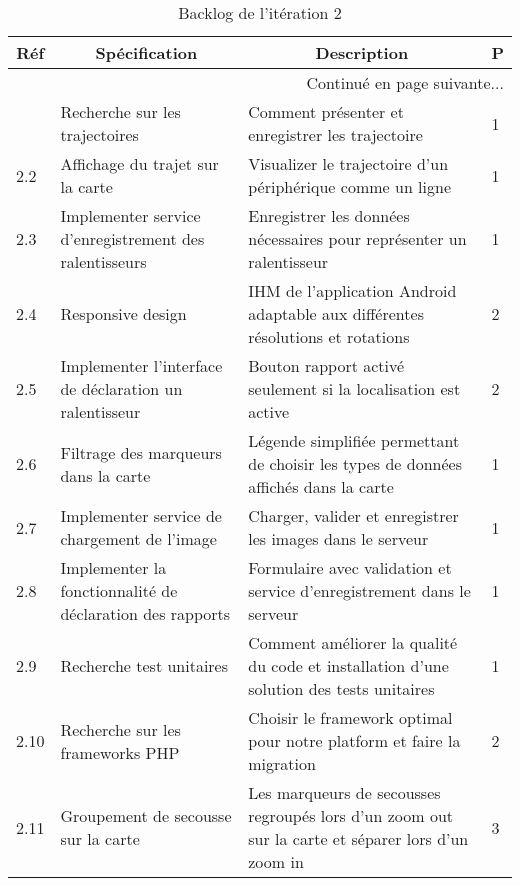 \begin{center}
    \footnotesize
    \begin{longtable}{| p{1cm} | p{5cm} | p{7cm} | l |}
        \caption{Backlog de l'itération 2}
\label{tab:sprint2-backlog} \\

        \hline
        \multicolumn{1}{|c}{\textbf{Réf}} &
        \multicolumn{1}{|c}{\textbf{Spécification}} &
        \multicolumn{1}{|c}{\textbf{Description}} &
        \multicolumn{1}{|c|}{\textbf{P}} \\ \hline
        \endhead

        \hline \multicolumn{4}{|r|}{{Continué en page suivante$\dotsc$}} \\ \hline
        \endfoot

        \hline \hline
        \endlastfoot

        \hline
2.1 & Recherche sur les trajectoires & Comment présenter et enregistrer les trajectoire & 1 \\ \hline
2.2 & Affichage du trajet sur la carte & Visualizer le trajectoire d'un périphérique comme un ligne & 1 \\ \hline
2.3 & Implementer service d'enregistrement des ralentisseurs & Enregistrer les données nécessaires pour représenter un ralentisseur & 1 \\ \hline
2.4 & Responsive design & IHM de l'application Android adaptable aux différentes résolutions et rotations & 2 \\ \hline
2.5 & Implementer l'interface de déclaration un ralentisseur & Bouton rapport activé seulement si la localisation est active & 2 \\ \hline
2.6 & Filtrage des marqueurs dans la carte & Légende simplifiée permettant de choisir les types de données affichés dans la carte & 1 \\ \hline
2.7 & Implementer service de chargement de l'image & Charger, valider et enregistrer les images dans le serveur & 1 \\ \hline
2.8 & Implementer la fonctionnalité de déclaration des rapports & Formulaire avec validation et service d'enregistrement dans le serveur & 1 \\ \hline
2.9 & Recherche test unitaires & Comment améliorer la qualité du code et installation d'une solution des tests unitaires & 1 \\ \hline
2.10 & Recherche sur les frameworks PHP & Choisir le framework optimal pour notre platform et faire la migration & 2 \\ \hline
2.11 & Groupement de secousse sur la carte & Les marqueurs de secousses regroupés lors d'un zoom out sur la carte et séparer lors d'un zoom in & 3 \\ \hline
    \end{longtable}
\end{center}

